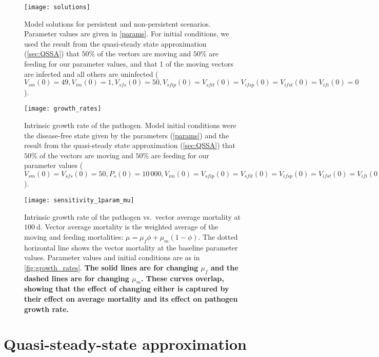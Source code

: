 \documentclass{article}
\newcommand{\comment}[1]{\textbf{#1}}
\begin{document}
\begin{figure}
  \centering
  \texttt{[image: solutions]}
  \caption{Model solutions for persistent and non-persistent
    scenarios.  Parameter values are given in \autoref{params}.
    For initial conditions, we used the result from the quasi-steady
    state approximation (\autoref{sec:QSSA}) that $50\%$ of the
    vectors are moving and $50\%$ are feeding for our parameter
    values, and that 1 of the moving vectors are infected and all
    others are uninfected ($V_{sm}(0) = 49, V_{im}(0) = 1, V_{sfs}(0) =
    50, V_{sfip}(0) = V_{sfit}(0) = V_{ifsp}(0) = V_{ifst}(0) =
    V_{ifi}(0) = 0$).}
  \label{fig:solutions}
\end{figure}

\begin{figure}
  \centering
  \texttt{[image: growth\_rates]}
  \caption{Intrinsic growth rate of the pathogen.  Model initial
    conditions were the disease-free state given by the parameters
    (\autoref{params}) and the result from the quasi-steady state
    approximation (\autoref{sec:QSSA}) that $50\%$ of the vectors are
    moving and $50\%$ are feeding for our parameter values ($V_{sm}(0)
    = V_{sfs}(0) = 50, P_s(0) = 10\,000, V_{im}(0) = V_{sfip}(0) =
    V_{sfit}(0) = V_{ifsp}(0) = V_{ifst}(0) = V_{ifi}(0) = P_i(0) =
    0$).}
  \label{fig:growth_rates}
\end{figure}

\begin{figure}
  \centering
  \texttt{[image: sensitivity\_1param\_mu]}
  \caption{Intrinsic growth rate of the pathogen vs.~vector average
    mortality at $100~\text{d}$.  Vector average mortality is the
    weighted average of the moving and feeding mortalities: $\mu =
    \mu_f \phi + \mu_m (1 - \phi)$.  The dotted horizontal
    line shows the vector mortality at the baseline parameter values.
    Parameter values and initial conditions are as in
    \autoref{fig:growth_rates}.  \comment{The solid lines are for
      changing $\mu_f$ and the dashed lines are for changing
      $\mu_m$.  These curves overlap, showing that the effect of
      changing either is captured by their effect on average mortality
      and its effect on pathogen growth rate.}}
  \label{fig:sensitivity_1param_mu}
\end{figure}


\section{Quasi-steady-state approximation}
\label{sec:QSSA}
\end{document}

